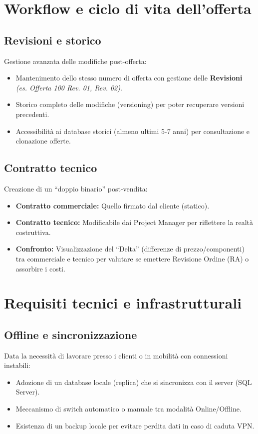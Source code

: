 \documentclass[12pt, a4paper]{article} %
\begin{document}
\section{Workflow e ciclo di vita dell'offerta}

\subsection{Revisioni e storico}
Gestione avanzata delle modifiche post-offerta:
\begin{itemize}
      \item Mantenimento dello stesso numero di offerta con gestione delle
            \textbf{Revisioni} \textit{(es. Offerta 100 Rev. 01, Rev. 02)}.
      \item Storico completo delle modifiche (versioning) per poter recuperare versioni
            precedenti.
      \item Accessibilità ai database storici (almeno ultimi 5-7 anni) per consultazione e
            clonazione offerte.
\end{itemize}

\subsection{Contratto tecnico}
Creazione di un ``doppio binario'' post-vendita:
\begin{itemize}
      \item \textbf{Contratto commerciale:} Quello firmato dal cliente (statico).
      \item \textbf{Contratto tecnico:} Modificabile dai Project Manager per riflettere la realtà costruttiva.
      \item \textbf{Confronto:} Visualizzazione del ``Delta'' (differenze di prezzo/componenti) tra commerciale e tecnico per valutare se emettere Revisione Ordine (RA)
            o assorbire i costi.
\end{itemize}

\section{Requisiti tecnici e infrastrutturali}

\subsection{Offline e sincronizzazione}
Data la necessità di lavorare presso i clienti o in mobilità con connessioni
instabili:
\begin{itemize}
      \item Adozione di un database locale (replica) che si sincronizza con il server (SQL
            Server).
      \item Meccanismo di switch automatico o manuale tra modalità Online/Offline.
      \item Esistenza di un backup locale per evitare perdita dati in caso di caduta VPN.
\end{itemize}
\end{document}
